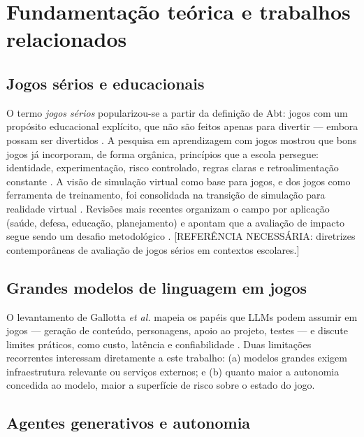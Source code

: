 \section{Fundamentação teórica e trabalhos relacionados}
\label{sec:fundamentacao}

\subsection{Jogos sérios e educacionais}

O termo \emph{jogos sérios} popularizou-se a partir da definição de Abt:
jogos com um propósito educacional explícito, que não são feitos apenas para
divertir --- embora possam ser divertidos \citep{abt1970serious}. A pesquisa em
aprendizagem com jogos mostrou que bons jogos já incorporam, de forma orgânica,
princípios que a escola persegue: identidade, experimentação, risco controlado,
regras claras e retroalimentação constante \citep{gee2003what}. A visão de
simulação virtual como base para jogos, e dos jogos como ferramenta de
treinamento, foi consolidada na transição de simulação para realidade
virtual \citep{zyda2005from}. Revisões mais recentes organizam o campo por
aplicação (saúde, defesa, educação, planejamento) e apontam que a avaliação de
impacto segue sendo um desafio metodológico
\citep{laamarti2014overview}. [REFERÊNCIA NECESSÁRIA: diretrizes
contemporâneas de avaliação de jogos sérios em contextos escolares.]

\subsection{Grandes modelos de linguagem em jogos}

O levantamento de Gallotta \emph{et al.} mapeia os papéis que LLMs podem
assumir em jogos --- geração de conteúdo, personagens, apoio ao projeto,
testes --- e discute limites práticos, como custo, latência e confiabilidade
\citep{gallotta2024largelanguage}. Duas limitações recorrentes interessam
diretamente a este trabalho: (a) modelos grandes exigem infraestrutura
relevante ou serviços externos; e (b) quanto maior a autonomia concedida ao
modelo, maior a superfície de risco sobre o estado do jogo.

\subsection{Agentes generativos e autonomia}

